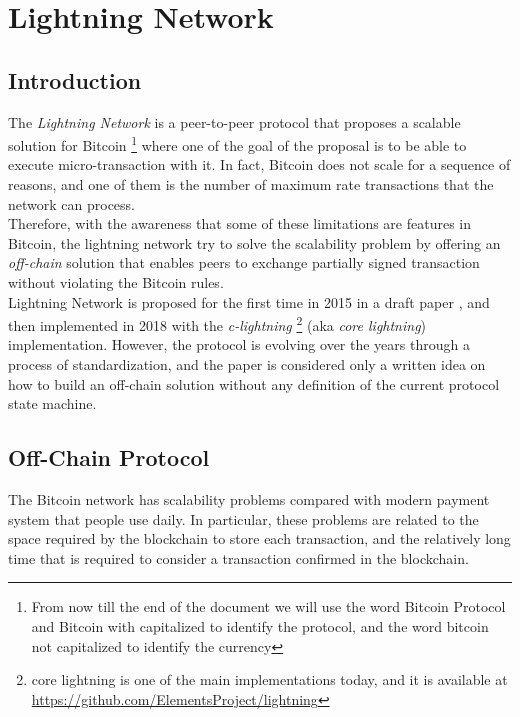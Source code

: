 \chapter{Lightning Network}
\label{sec:lightning_network}

\newcommand{\noteOnBitcoinNaming}[0]{
    \footnote{
        From now till the end of the document we will use the word Bitcoin Protocol and
        Bitcoin with capitalized to identify the protocol, and the word bitcoin not capitalized to identify the currency
    }
}

\newcommand{\noteOnCLNImpl}[0]{
    \footnote{
    core lightning is one of the main implementations today, and it is available at
    \href{https://github.com/ElementsProject/lightning}{https://github.com/ElementsProject/lightning}
    }
}



\section{Introduction}

The \emph{Lightning Network} is a peer-to-peer protocol that proposes a scalable solution for Bitcoin\noteOnBitcoinNaming where one
of the goal of the proposal is to be able to execute micro-transaction with it.
In fact, Bitcoin does not scale for a sequence of reasons, and one of them is the number of
maximum rate transactions that the network can process.\\
Therefore, with the awareness that some of these limitations are features in Bitcoin, the lightning network try to solve
the scalability problem by offering an \emph{off-chain} solution that enables peers to exchange partially
signed transaction without violating the Bitcoin rules.\\
Lightning Network is proposed for the first time in 2015 in a draft paper \cite{lightning-network-paper},
and then implemented in 2018 with the \emph{c-lightning}\noteOnCLNImpl (aka \emph{core lightning}) implementation.
However, the protocol is evolving over the years through a process of standardization\cite{lightning-bolts}, and the paper is considered
only a written idea on how to build an off-chain solution without any definition of the current protocol state machine.

\section{Off-Chain Protocol}

The Bitcoin network has scalability problems compared with modern payment system that people use daily.
In particular, these problems are related to the space required by the blockchain to store each transaction,
and the relatively long time that is required to consider a transaction confirmed in the blockchain.

